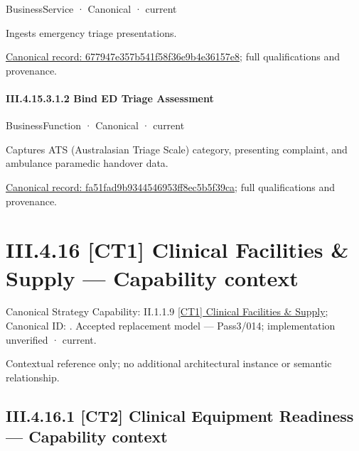 \label{element:677947e357b541f58f36e9b4e36157e8}
{\small BusinessService · Canonical · current}\par

Ingests emergency triage presentations.


{\footnotesize \href{../../../../../../../../continuum/business/business-service/677947e357b541f58f36e9b4e36157e8.md}{Canonical record: 677947e357b541f58f36e9b4e36157e8}; full qualifications and provenance.}\par
\paragraph*{III.4.15.3.1.2 Bind ED Triage Assessment}
\label{navigation:III.4.15.3.1.2}

\label{element:fa51fad9b9344546953ff8ec5b5f39ca}
{\small BusinessFunction · Canonical · current}\par

Captures ATS (Australasian Triage Scale) category, presenting complaint, and ambulance paramedic handover data.


{\footnotesize \href{../../../../../../../../continuum/business/business-function/fa51fad9b9344546953ff8ec5b5f39ca.md}{Canonical record: fa51fad9b9344546953ff8ec5b5f39ca}; full qualifications and provenance.}\par
\section*{III.4.16 [CT1] Clinical Facilities \& Supply — Capability context}
\label{navigation:III.4.16}

{\small Canonical Strategy Capability: II.1.1.9 \hyperref[element:5969b982a40449bea3828207485da812]{[CT1] Clinical Facilities \& Supply}; Canonical ID: \texttt{}. Accepted replacement model — Pass3/014; implementation unverified · current.}\par
Contextual reference only; no additional architectural instance or semantic relationship.\par
\subsection*{III.4.16.1 [CT2] Clinical Equipment Readiness — Capability context}
\label{navigation:III.4.16.1}


